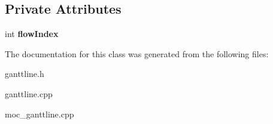 \subsection*{Private Attributes}
\begin{DoxyCompactItemize}
\item 
\hypertarget{class_gantt_line_afdc3b8ef93711d3a20dce12d50b4460f}{}int {\bfseries flow\+Index}\label{class_gantt_line_afdc3b8ef93711d3a20dce12d50b4460f}

\end{DoxyCompactItemize}


The documentation for this class was generated from the following files\+:\begin{DoxyCompactItemize}
\item 
ganttline.\+h\item 
ganttline.\+cpp\item 
moc\+\_\+ganttline.\+cpp\end{DoxyCompactItemize}
